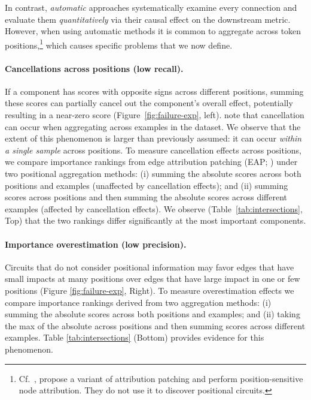 In contrast, \emph{automatic} approaches \citep{syed2023attribution, hanna2024have} systematically examine every connection and evaluate them \emph{quantitatively} via their causal effect on the downstream metric. However, when using automatic methods it is common to aggregate across token positions,\footnote{Cf.\ \citet{kramar2024atp}, propose a variant of attribution patching and perform position-sensitive node attribution. They do not use it to discover positional circuits.} which causes specific problems that we now define.

\paragraph{Cancellations across positions (low recall).}
If a component has scores with opposite signs across different positions, summing these scores can partially cancel out the component's overall effect, potentially resulting in a near-zero score (Figure~\ref{fig:failure-exp}, left).
\citet{kramar2024atp} note that cancellation can occur when aggregating across examples in the dataset. We observe that the extent of this phenomenon is larger than previously assumed: it can occur \emph{within a single sample} across positions. 
To measure cancellation effects across positions, we compare importance rankings from edge attribution patching (EAP; \citealp{syed2023attribution}) under two positional aggregation methods: (i) summing the absolute scores across both positions and examples (unaffected by cancellation effects); and (ii) summing scores across positions and then summing the absolute scores across different examples (affected by cancellation effects). 
We observe (Table~\ref{tab:intersections}, Top)  that the two rankings differ significantly at the most important components. 

\paragraph{Importance overestimation (low precision).} 
Circuits that do not consider positional information may favor edges that have small impacts at many positions over edges that have large impact in one or few positions (Figure \ref{fig:failure-exp}, Right). To measure overestimation effects we compare importance rankings derived from two aggregation methods: (i) summing the absolute scores across both positions and examples; and (ii) taking the max of the absolute across positions and then summing scores across different examples. Table \ref{tab:intersections} (Bottom) provides evidence for this phenomenon.


